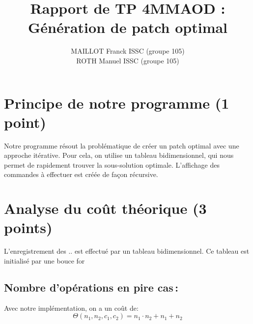 \documentclass[a4paper, 10pt, french]{article}
\title{Rapport de TP 4MMAOD : Génération de patch optimal}
\author{
MAILLOT Franck ISSC (groupe 105) 
\\ ROTH Manuel ISSC (groupe 105) 
}
\begin{document}
\maketitle


\section{Principe de notre  programme (1 point)}
Notre programme résout la problématique de créer un patch optimal avec une approche itérative. Pour cela, on utilise un tableau bidimensionnel,
qui nous permet de rapidement trouver la sous-solution optimale. L'affichage des commandes à effectuer est créée de fa\c{c}on récursive.

\section{Analyse du coût théorique (3 points)}
L'enregistrement des .. est effectué par un tableau bidimensionnel. Ce tableau est initialisé par une bouce for

\subsection{Nombre  d'opérations en pire cas\,: }
Avec notre implémentation, on a un coût de:\\
\[
\Theta(n_1,n_2,c_1,c_2) = n_1 \cdot n_2 + n_1 + n_2 
\]
\end{document}
